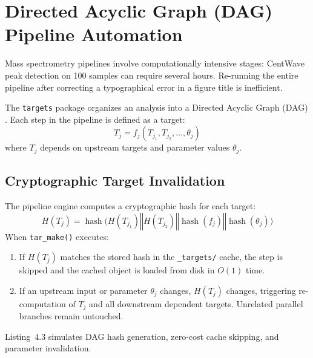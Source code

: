 \documentclass[11pt,twoside,openright]{book}
\begin{document}
\FloatBarrier
\section{Directed Acyclic Graph (DAG) Pipeline Automation}
\label{sec:targets_dag}

Mass spectrometry pipelines involve computationally intensive stages: CentWave peak detection on 100 samples can require several hours. Re-running the entire pipeline after correcting a typographical error in a figure title is inefficient.

The \texttt{targets} package organizes an analysis into a Directed Acyclic Graph (DAG) \cite{landau2021targets}. Each step in the pipeline is defined as a target:
\begin{equation}
T_j = f_j(T_{j_1}, T_{j_2}, \dots, \theta_j)
\label{eq:dag_node}
\end{equation}
where $T_j$ depends on upstream targets and parameter values $\theta_j$.

\subsection{Cryptographic Target Invalidation}

The pipeline engine computes a cryptographic hash for each target:
\begin{equation}
H(T_j) = \operatorname{hash}\Big( H(T_{j_1}) \mathbin{\Vert} H(T_{j_2}) \mathbin{\Vert} \operatorname{hash}(f_j) \mathbin{\Vert} \operatorname{hash}(\theta_j) \Big)
\label{eq:target_hash}
\end{equation}
When \texttt{tar\_make()} executes:
\begin{enumerate}
\item If $H(T_j)$ matches the stored hash in the \texttt{\_targets/} cache, the step is skipped and the cached object is loaded from disk in $O(1)$ time.
\item If an upstream input or parameter $\theta_j$ changes, $H(T_j)$ changes, triggering re-computation of $T_j$ and all downstream dependent targets. Unrelated parallel branches remain untouched.
\end{enumerate}

Listing~4.3 simulates DAG hash generation, zero-cost cache skipping, and parameter invalidation.
\end{document}
